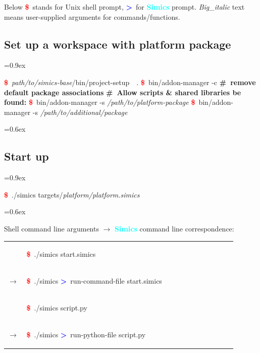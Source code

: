 \documentclass[8pt]{extarticle}
\newenvironment{code}[1][]{%
\begin{prebox}[#1]\obeylines%
\fontdimen2\font=0.9ex%
}{%
\end{prebox}%
\fontdimen2\font=0.6ex%
}
\newenvironment{codem}[2][\linewidth]{%
\begin{minipage}{#1}%
\begin{prebox}[colback=#2]\obeylines}{%
\end{prebox}%
\end{minipage}}
\newenvironment{code9}{%
\begin{codem}[0.9\linewidth]{green!10}}{\end{codem}}
\newcommand{\prompt}{\textcolor{red}{\textbf{\$}\ }}
\newcommand{\sprompt}{\textcolor{blue}{\textbf{>}\ }}
\newcommand{\cmtcommon}[1]{\textcolor{Sepia}{\textbf{#1}}}
\newcommand{\cmt}[1]{\cmtcommon{\#\ #1}}
\newcommand{\p}[1]{\textit{\large#1}}
\newcommand{\Simics}{\textcolor{cyan}{\textbf{Simics}}}
\begin{document}
\begin{multicols*}{3}
    Below \prompt stands for Unix shell prompt, \sprompt for \Simics{} prompt.
    \p{Big_italic} text means user-supplied arguments for commands/functions.

\subsection{Set up a workspace with platform package}
    \begin{code}
        \prompt \p{path/to/simics-base}/bin/project-setup\ \ .
        \prompt bin/addon-manager -c  \cmt{remove default package associations}
        \cmt{Allow scripts \& shared libraries be found:}
        \prompt bin/addon-manager -s \p{/path/to/platform-package}
        \prompt bin/addon-manager -s \p{/path/to/additional/package}
    \end{code}

\subsection{Start up}
    \begin{code}
        \prompt ./simics targets/\p{platform/platform.simics}
    \end{code}

    
    Shell command line arguments $\longrightarrow$ \Simics{} command line 
        correspondence:

    \noindent\begin{tabular}{p{0.05\linewidth}p{0.85\linewidth}}
        &
        \begin{code9}
            \prompt ./simics start.simics
        \end{code9}
        \vspace{0.05cm}
        \\
        $\longrightarrow$ &
        \begin{code9}
            \prompt ./simics
            \sprompt run-command-file start.simics
        \end{code9}
        \vspace{0.2cm}
        \\

        & \begin{code9}
            \prompt ./simics script.py
        \end{code9}
        \vspace{0.05cm}
        \\
        $\longrightarrow$ &
        \begin{code9}
            \prompt ./simics
            \sprompt run-python-file script.py
        \end{code9}
        \vspace{0.2cm}
        \\


\end{tabular}
\end{multicols*}
\end{document}
